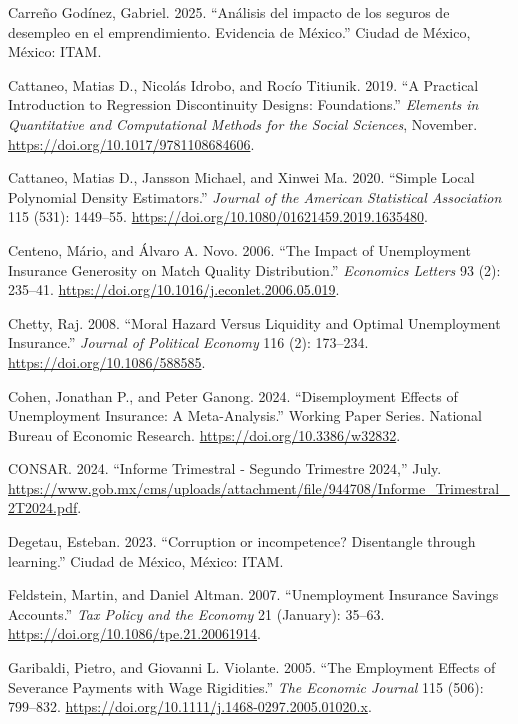 \documentclass[
  4pt,
]{report}
\newlength{\cslhangindent}
\newenvironment{CSLReferences}[2] %
 {\begin{list}{}{%
  \setlength{\itemindent}{0pt}
  \setlength{\leftmargin}{0pt}
  \setlength{\parsep}{0pt}
  \ifodd #1
   \setlength{\leftmargin}{\cslhangindent}
   \setlength{\itemindent}{-1\cslhangindent}
  \fi
  \setlength{\itemsep}{#2\baselineskip}}}
 {\end{list}}
\begin{document}
\begin{CSLReferences}{1}{0}
Carreño Godínez, Gabriel. 2025. {``Análisis del impacto de los seguros
de desempleo en el emprendimiento. Evidencia de México.''} Ciudad de
México, México: ITAM.

Cattaneo, Matias D., Nicolás Idrobo, and Rocío Titiunik. 2019. {``A
Practical Introduction to Regression Discontinuity Designs:
Foundations.''} \emph{Elements in Quantitative and Computational Methods
for the Social Sciences}, November.
\url{https://doi.org/10.1017/9781108684606}.

Cattaneo, Matias D., Jansson Michael, and Xinwei Ma. 2020. {``Simple
Local Polynomial Density Estimators.''} \emph{Journal of the American
Statistical Association} 115 (531): 1449--55.
\url{https://doi.org/10.1080/01621459.2019.1635480}.

Centeno, Mário, and Álvaro A. Novo. 2006. {``The Impact of Unemployment
Insurance Generosity on Match Quality Distribution.''} \emph{Economics
Letters} 93 (2): 235--41.
\url{https://doi.org/10.1016/j.econlet.2006.05.019}.

Chetty, Raj. 2008. {``Moral Hazard Versus Liquidity and Optimal
Unemployment Insurance.''} \emph{Journal of Political Economy} 116 (2):
173--234. \url{https://doi.org/10.1086/588585}.

Cohen, Jonathan P., and Peter Ganong. 2024. {``Disemployment Effects of
Unemployment Insurance: A Meta-Analysis.''} Working Paper Series.
National Bureau of Economic Research.
\url{https://doi.org/10.3386/w32832}.

CONSAR. 2024. {``Informe Trimestral - Segundo Trimestre 2024,''} July.
\url{https://www.gob.mx/cms/uploads/attachment/file/944708/Informe_Trimestral_2T2024.pdf}.

Degetau, Esteban. 2023. {``Corruption or incompetence? Disentangle
through learning.''} Ciudad de México, México: ITAM.

Feldstein, Martin, and Daniel Altman. 2007. {``Unemployment Insurance
Savings Accounts.''} \emph{Tax Policy and the Economy} 21 (January):
35--63. \url{https://doi.org/10.1086/tpe.21.20061914}.

Garibaldi, Pietro, and Giovanni L. Violante. 2005. {``The Employment
Effects of Severance Payments with Wage Rigidities.''} \emph{The
Economic Journal} 115 (506): 799--832.
\url{https://doi.org/10.1111/j.1468-0297.2005.01020.x}.


\end{CSLReferences}
\end{document}
